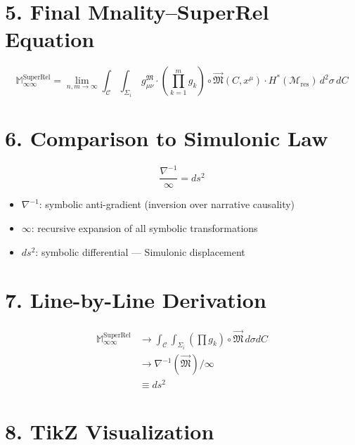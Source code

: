 \documentclass[10pt]{article}
\begin{document}
\section{5. Final Mnality–SuperRel Equation}
\[
\boxed{
\mathbb{M}_{\infty\infty}^{\text{SuperRel}} =
\lim_{n,m \to \infty}
\int_{\mathcal{C}} \int_{\Sigma_i}
\, g_{\mu\nu}^{\mathfrak{M}} \cdot
\left(
\prod_{k=1}^m g_k
\right)
\circ \vec{\mathfrak{M}}(C, x^\mu)
\cdot
H^*(\mathcal{M}_{\text{res}})
\, d^2 \sigma \, dC
}
\]

\section{6. Comparison to Simulonic Law}
\[
\frac{\nabla^{-1}}{\infty} = ds^2
\]
\begin{itemize}
  \item \( \nabla^{-1} \): symbolic anti-gradient (inversion over narrative causality)
  \item \( \infty \): recursive expansion of all symbolic transformations
  \item \( ds^2 \): symbolic differential — Simulonic displacement
\end{itemize}

\section{7. Line-by-Line Derivation}
\begin{align*}
\mathbb{M}_{\infty\infty}^{\text{SuperRel}} &\to \int_{\mathcal{C}} \int_{\Sigma_i} \left(\prod g_k \right) \circ \vec{\mathfrak{M}} \, d\sigma dC \\[-1ex]
&\to \nabla^{-1}(\vec{\mathfrak{M}}) / \infty \\[-1ex]
&\equiv ds^2
\end{align*}

\section{8. TikZ Visualization}
\begin{center}
\end{center}
\end{document}
